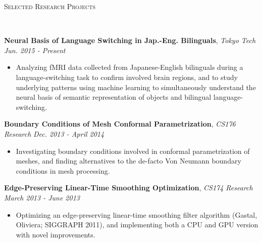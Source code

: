 \documentclass[9pt]{article}
\newenvironment{changemargin}[2]{%
  \begin{list}{}{%
    \setlength{\topsep}{0pt}%
    \setlength{\leftmargin}{#1}%
    \setlength{\rightmargin}{#2}%
    \setlength{\listparindent}{\parindent}%
    \setlength{\itemindent}{\parindent}%
    \setlength{\parsep}{\parskip}%
  }%
  \item[]}{\end{list}
}
\newcommand{\lineover}{
	\begin{changemargin}{-0.05in}{-0.05in}
		\vspace*{-8pt}
		\hrulefill \\
		\vspace*{-2pt}
	\end{changemargin}
}
\newcommand{\header}[1]{
	\begin{changemargin}{-0.5in}{-0.5in}
		\scshape{#1}\\
  	\lineover
	\end{changemargin}
}
\newenvironment{body} {
	\vspace*{-16pt}
	\begin{changemargin}{-0.25in}{-0.5in}
  }	
	{\end{changemargin}
}
\begin{document}
\header{Selected Research Projects}
\begin{body}
	\vspace{16pt}
	\textbf{Neural Basis of Language Switching in Jap.-Eng. Bilinguals}, \emph{Tokyo Tech} \hfill \emph{Jun. 2015 - Present} \\
		\vspace*{-3pt}
	\begin{itemize} \itemsep -0pt
	\item Analyzing fMRI data collected from Japanese-English bilinguals during a language-switching task to confirm involved brain regions, and to study underlying patterns using machine learning to simultaneously understand the neural basis of semantic representation of objects and bilingual language-switching.
	\end{itemize}
	\vspace{-1pt}
	\textbf{Boundary Conditions of Mesh Conformal Parametrization}, \emph{CS176 Research} \hfill \emph{Dec. 2013 - April 2014} \\
		\vspace*{-3pt}
	\begin{itemize} \itemsep -0pt
	\item Investigating boundary conditions involved in conformal parametrization of meshes, and finding alternatives to the de-facto Von Neumann boundary conditions in mesh processing.
	\end{itemize}
		\vspace*{-1pt}
	\textbf{Edge-Preserving Linear-Time Smoothing Optimization}, \emph{CS174 Research} \hfill \emph{March 2013 - June 2013} \\
		\vspace*{-3pt}
	\begin{itemize} \itemsep -0pt
		\item Optimizing an edge-preserving linear-time smoothing filter algorithm (Gastal, Oliviera; SIGGRAPH 2011), and implementing both a CPU and GPU version with novel improvements.
	\end{itemize}
		\vspace*{-3pt}

\end{body}
\end{document}
